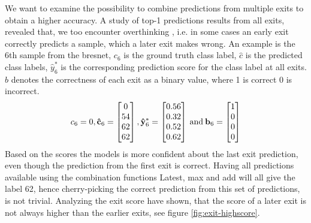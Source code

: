 We want to examine the possibility to combine predictions from multiple exits to obtain a higher accuracy. A study of top-1 predictions results from all exits, revealed that, we too encounter overthinking \cite{kaya_shallow-deep_nodate}, i.e. in some cases an early exit correctly predicts a sample, which a later exit makes wrong. An example is the 6th sample from the \gls{bresnet}, $ c_6 $ is the ground truth class label, $ \hat{c} $ is the predicted class labels, $ \hat{y}^*_6 $ is the corresponding prediction score for the class label at all exits. $ b $ denotes the correctness of each exit as a binary value, where 1 is correct 0 is incorrect.
\begin{align*}
c_6=0,
\mathbf{\hat{c}}_{6}=
\begin{bmatrix}
0 \\
54 \\
62 \\
62
\end{bmatrix},
\mathbf{\hat{y}}^{*}_{6}=
\begin{bmatrix}
0.56 \\
0.32 \\
0.52 \\
0.62
\end{bmatrix} \text{\:and\:}
\mathbf{b}_{6}=
\begin{bmatrix}
1 \\
0 \\
0 \\
0
\end{bmatrix}
\end{align*}
Based on the scores the models is more confident about the last exit prediction, even though the prediction from the first exit is correct. Having all predictions available using the combination functions Latest, max and add will all give the label 62, hence cherry-picking the correct prediction from this set of predictions, is not trivial. Analyzing the exit score have shown, that the score of a later exit is not always higher than the earlier exits, see figure \ref{fig:exit-highscore}.

